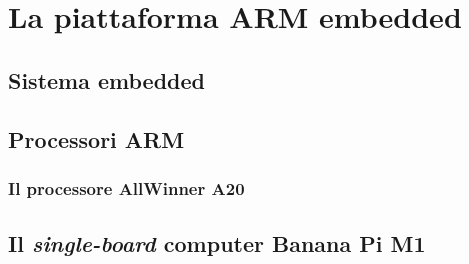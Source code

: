 
\chapter{La piattaforma ARM embedded} %

\label{Chapter5} %



\section{Sistema embedded}


\section{Processori ARM}


\subsection{Il processore AllWinner A20}


\section{Il \emph{single-board} computer Banana Pi M1}


